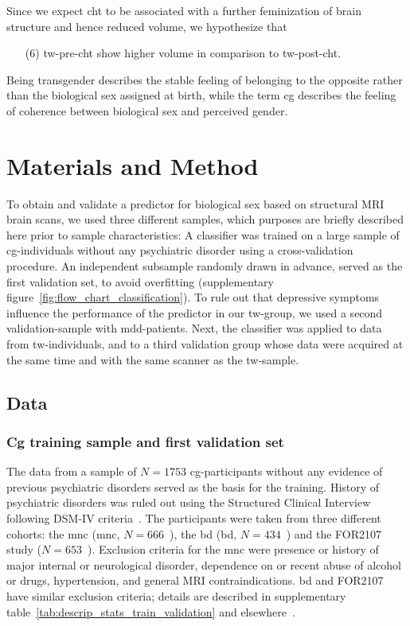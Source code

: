 \documentclass{article}
\begin{document}
    Since we expect \ac{cht} to be associated with a further feminization of brain structure and hence reduced volume, we hypothesize that
    \begin{itemize}
        \item[(6)]    \ac{tw}-pre-\ac{cht} show higher volume in comparison to \ac{tw}-post-\ac{cht}.
    \end{itemize}
    Being transgender describes the stable feeling of belonging to the opposite rather than the biological sex assigned at birth, while the term \ac{cg} describes the feeling of coherence between biological sex and perceived gender.


    \section{Materials and Method}
    To obtain and validate a predictor for biological sex based on structural MRI brain scans, we used three different samples, which purposes are briefly described here prior to sample characteristics: A classifier was trained on a large sample of \ac{cg}-individuals without any psychiatric disorder using a cross-validation procedure. An independent subsample randomly drawn in advance, served as the first validation set, to avoid overfitting (supplementary figure~\ref{fig:flow_chart_classification}). To rule out that depressive symptoms influence the performance of the predictor in our \ac{tw}-group, we used a second validation-sample with \ac{mdd}-patients. Next, the classifier was applied to data from \ac{tw}-individuals, and to a third validation group whose data were acquired at the same time and with the same scanner as the \ac{tw}-sample.

    \subsection{Data}

    \subsubsection{\acl*{Cg} training sample and first validation set}
    The data from a sample of $N = 1753$ \ac{cg}-participants without any evidence of previous psychiatric disorders served as the basis for the training. History of psychiatric disorders was ruled out using the Structured Clinical Interview following DSM-IV criteria~\cite{Wittchen1997}. The participants were taken from three different cohorts: the \acl{mnc} (\acs{mnc}, $N = 666$~\cite{Dannlowski2015}), the \acl{bd} (\acs{bd}, $N = 434$~\cite{Teuber2017}) and the FOR2107 study ($N = 653$~\cite{Kircher2018, Vogelbacher2018}). Exclusion criteria for the \ac{mnc} were presence or history of major internal or neurological disorder, dependence on or recent abuse of alcohol or drugs, hypertension, and general MRI contraindications. \ac{bd} and FOR2107 have similar exclusion criteria; details are described in supplementary table~\ref{tab:descrip_stats_train_validation} and elsewhere~\cite{Teismann2014, Kircher2018}.
\end{document}
